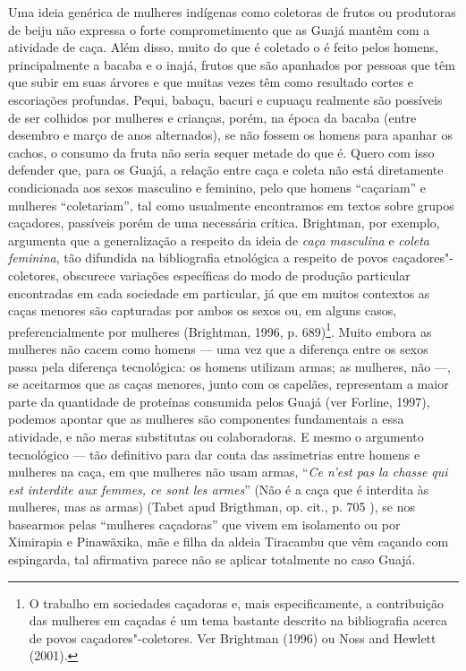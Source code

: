 Uma ideia genérica de mulheres indígenas como coletoras de frutos ou
produtoras de beiju não expressa o forte comprometimento que as Guajá
mantêm com a atividade de caça. Além disso, muito do que é coletado o é
feito pelos homens, principalmente a bacaba e o inajá, frutos que são
apanhados por pessoas que têm que subir em suas árvores e que muitas
vezes têm como resultado cortes e escoriações profundas. Pequi, babaçu,
bacuri e cupuaçu realmente são possíveis de ser colhidos por mulheres e
crianças, porém, na época da bacaba (entre desembro e março de anos
alternados), se não fossem os homens para apanhar os cachos, o consumo
da fruta não seria sequer metade do que é. Quero com isso defender que,
para os Guajá, a relação entre caça e coleta não está diretamente
condicionada aos sexos masculino e feminino, pelo que homens ``caçariam''
e mulheres ``coletariam'', tal como usualmente encontramos em textos sobre
grupos caçadores, passíveis porém de uma necessária crítica. Brightman,
por exemplo, argumenta que a generalização a respeito da ideia de
\emph{caça masculina} e \emph{coleta feminina}, tão difundida na
bibliografia etnológica a respeito de povos caçadores"-coletores,
obscurece variações específicas do modo de produção particular
encontradas em cada sociedade em particular, já que em muitos contextos
as caças menores são capturadas por ambos os sexos ou, em alguns casos,
preferencialmente por mulheres (Brightman, 1996, p. 689)\footnote{O
  trabalho em sociedades caçadoras e, mais especificamente, a
  contribuição das mulheres em caçadas é um tema bastante descrito na
  bibliografia acerca de povos caçadores"-coletores. Ver Brightman (1996)
  ou Noss and Hewlett (2001).}. Muito embora as mulheres não cacem como
homens --- uma vez que a diferença entre os sexos passa pela diferença
tecnológica: os homens utilizam armas; as mulheres, não ---, se aceitarmos
que as caças menores, junto com os capelães, representam a maior parte
da quantidade de proteínas consumida pelos Guajá (ver Forline, 1997),
podemos apontar que as mulheres são componentes fundamentais a essa
atividade, e não meras substitutas ou colaboradoras. E mesmo o argumento
tecnológico --- tão definitivo para dar conta das assimetrias entre homens
e mulheres na caça, em que mulheres não usam armas, ``\emph{Ce n'est pas
la chasse qui est interdite aux femmes, ce sont les armes}'' (Não é a
caça que é interdita às mulheres, mas as armas) (Tabet apud Brigthman,
op. cit., p. 705 ), se nos basearmos pelas ``mulheres caçadoras'' que
vivem em isolamento ou por Ximirapia e Pinawãxika, mãe e filha da aldeia
Tiracambu que vêm caçando com espingarda, tal afirmativa parece não se
aplicar totalmente no caso Guajá.

